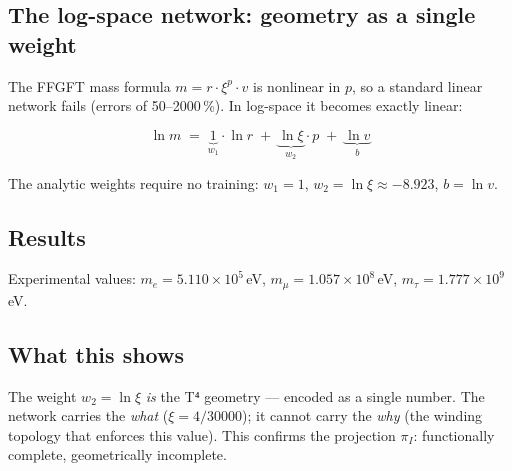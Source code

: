\subsection{The log-space network: geometry as a single weight}

The FFGFT mass formula $m = r \cdot \xi^p \cdot v$ is nonlinear in $p$,
so a standard linear network fails (errors of 50--2000\,\%). In
log-space it becomes exactly linear:

\begin{equation}
  \ln m \;=\; \underbrace{1}_{w_1}\cdot\ln r
           \;+\; \underbrace{\ln\xi}_{w_2}\cdot p
           \;+\; \underbrace{\ln v}_{b}
  \tag{243.11}
\end{equation}

The analytic weights require no training:
$w_1 = 1$, $w_2 = \ln\xi \approx -8.923$, $b = \ln v$.

\subsection{Results}

\begin{center}
\renewcommand{\arraystretch}{1.3}
{\small
{}
}
\end{center}

Experimental values: $m_e = 5.110\times10^5$\,eV,
$m_\mu = 1.057\times10^8$\,eV, $m_\tau = 1.777\times10^9$\,eV.

\subsection{What this shows}

The weight $w_2 = \ln\xi$ \emph{is} the T⁴ geometry --- encoded as
a single number. The network carries the \emph{what} ($\xi = 4/30000$);
it cannot carry the \emph{why} (the winding topology that enforces this
value). This confirms the projection $\pi_I$: functionally complete,
geometrically incomplete.

